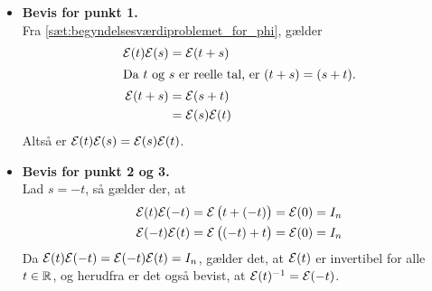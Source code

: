\begin{bev}\textbf{} %
\newline
\begin{itemize}
\item [] \textbf{Bevis for punkt 1.}\\
Fra \autoref{sæt:begyndelsesværdiproblemet_for_phi}, gælder
\begin{align*}
    \mathcal{E}(t)\mathcal{E}(s)&=\mathcal{E}(t+s)\\
    \intertext{Da $t$ og $s$ er reelle tal, er $(t+s)=(s+t)$.}
    \mathcal{E}(t+s)&=\mathcal{E}(s+t)\\
    &=\mathcal{E}(s)\mathcal{E}(t)
\end{align*}
Altså er $\mathcal{E}(t)\mathcal{E}(s)=\mathcal{E}(s)\mathcal{E}(t)$.
\item [] \textbf{Bevis for punkt 2 og 3.}\\
Lad $s=-t$, så gælder der, at
\begin{align*}
    \mathcal{E}(t)\mathcal{E}(-t) = \mathcal{E}\left(t+(-t)\right) = \mathcal{E}(0) = I_n\\
    \mathcal{E}(-t)\mathcal{E}(t) = \mathcal{E}\left((-t)+t\right) = \mathcal{E}(0) = I_n
\end{align*}
Da $\mathcal{E}(t)\mathcal{E}(-t) = \mathcal{E}(-t)\mathcal{E}(t) = I_n$, gælder det, at $\mathcal{E}(t)$ er invertibel for alle $t\in \mathbb{R}$, og herudfra er det også bevist, at $\mathcal{E}(t)^{-1} = \mathcal{E}(-t)$.
\end{itemize}
\end{bev}
